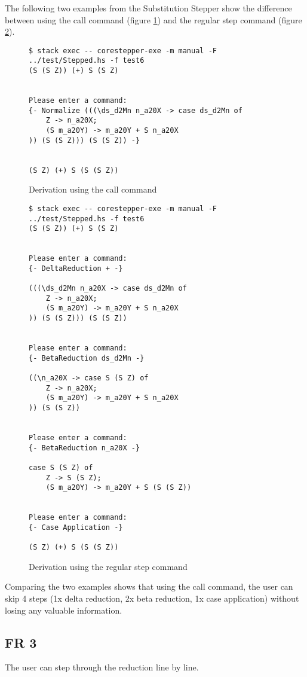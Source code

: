 The following two examples from the Substitution Stepper show the difference between using the call command (figure \ref*{fig:FR2exampleCall}) and the regular step command (figure \ref*{fig:FR2exampleStep}).

\begin{figure}[!ht]
\begin{verbatim}
$ stack exec -- corestepper-exe -m manual -F ../test/Stepped.hs -f test6
(S (S Z)) (+) S (S Z)


Please enter a command:
{- Normalize (((\ds_d2Mn n_a20X -> case ds_d2Mn of
    Z -> n_a20X;
    (S m_a20Y) -> m_a20Y + S n_a20X
)) (S (S Z))) (S (S Z)) -}


(S Z) (+) S (S (S Z))
\end{verbatim}
\caption{Derivation using the call command}
\label{fig:FR2exampleCall}
\end{figure}

\begin{figure}[!ht]
\begin{verbatim}
$ stack exec -- corestepper-exe -m manual -F ../test/Stepped.hs -f test6
(S (S Z)) (+) S (S Z)


Please enter a command:
{- DeltaReduction + -}

(((\ds_d2Mn n_a20X -> case ds_d2Mn of
    Z -> n_a20X;
    (S m_a20Y) -> m_a20Y + S n_a20X
)) (S (S Z))) (S (S Z))


Please enter a command:
{- BetaReduction ds_d2Mn -}

((\n_a20X -> case S (S Z) of
    Z -> n_a20X;
    (S m_a20Y) -> m_a20Y + S n_a20X
)) (S (S Z))


Please enter a command:
{- BetaReduction n_a20X -}

case S (S Z) of
    Z -> S (S Z);
    (S m_a20Y) -> m_a20Y + S (S (S Z))


Please enter a command:
{- Case Application -}

(S Z) (+) S (S (S Z))
\end{verbatim}
\caption{Derivation using the regular step command}
\label{fig:FR2exampleStep}
\end{figure}

Comparing the two examples shows that using the call command,
the user can skip 4 steps (1x delta reduction, 2x beta reduction, 1x case application)
without losing any valuable information.

\newpage
\subsection{FR 3}
The user can step through the reduction line by line.


